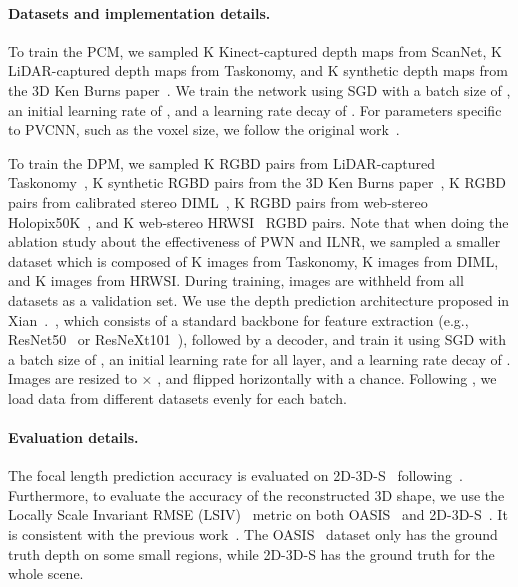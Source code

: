 \paragraph{Datasets and implementation details.}
\label{sec:data}
To train the PCM, we sampled K Kinect-captured depth maps from ScanNet, K LiDAR-captured depth maps from Taskonomy, and K synthetic depth maps from the 3D Ken Burns paper~\cite{Niklaus_TOG_2019}.
We train the network using SGD with a batch size of , an initial learning rate of , and a learning rate decay of . For parameters specific to PVCNN, such as the voxel size, we follow the original work~\cite{liu2019pvcnn}.

To train the DPM, we sampled K RGBD pairs from LiDAR-captured Taskonomy~\cite{zamir2018taskonomy}, K synthetic RGBD pairs from the 3D Ken Burns paper~\cite{Niklaus_TOG_2019},  K RGBD pairs from calibrated stereo DIML~\cite{kim2018deep}, K RGBD pairs from web-stereo Holopix50K~\cite{hua2020holopix50k}, and K web-stereo HRWSI~\cite{xian2020structure} RGBD pairs.
Note that when doing the ablation study about the effectiveness of PWN and ILNR, we sampled a smaller dataset which is composed of K images from Taskonomy, K images from DIML, and K images from HRWSI. 
During training,  images are withheld from all datasets as a validation set.
We use the depth prediction architecture proposed in Xian~\etal.~\cite{xian2020structure}, which consists of a standard backbone for feature extraction (e.g., ResNet50~\cite{he2016deep} or ResNeXt101~\cite{xie2017aggregated}), followed by a decoder, and train it using SGD with a batch size of , an initial learning rate  for all layer, and a learning rate decay of . 
Images are resized to  × , and flipped horizontally with a  chance.
Following \cite{yin2020diversedepth}, we load data from different datasets evenly for each batch.

\paragraph{Evaluation details.}
The focal length prediction accuracy is evaluated on 2D-3D-S~\cite{armeni2017joint} following~\cite{hold2018perceptual}. 
Furthermore, to evaluate the accuracy of the reconstructed 3D shape, we use the Locally Scale Invariant RMSE (LSIV)~\cite{chen2020oasis} metric on both OASIS~\cite{chen2020oasis} and 2D-3D-S~\cite{armeni2017joint}. It is consistent with the previous work~\cite{chen2020oasis}. The OASIS~\cite{chen2020oasis} dataset only has the ground truth depth on some small regions, while 2D-3D-S has the ground truth for the whole scene.

